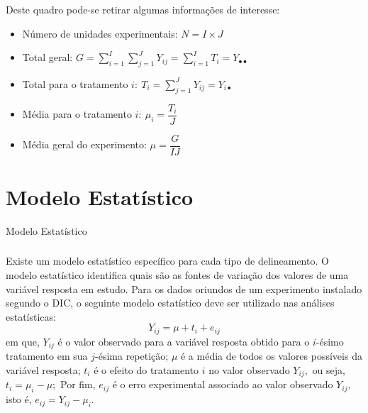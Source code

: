 \documentclass[14pt,aspectratio=1610]{beamer}
\begin{document}
\begin{frame}{}
\frametitle{}
\begin{block}{}
\justifying
Deste quadro pode-se retirar algumas informações de interesse:
\begin{itemize}
\item Número de unidades experimentais: $N=I\times J$\pause
\item Total geral: $G={\displaystyle \sum_{i=1}^{I}\sum_{j=1}^{J}Y_{ij}=\sum_{i=1}^{I}T_{i}=Y_{\bullet \bullet}}$\pause
\item Total para o tratamento $i:\ T_{i}={\displaystyle \sum_{j=1}^{J}Y_{ij}=Y_{i\bullet}}$\pause
\item Média para o tratamento $i:\ \mu_{i}=\dfrac{T_{i}}{J}$\pause
\item Média geral do experimento: $\mu=\dfrac{G}{IJ}$
\end{itemize}
\end{block}
\end{frame}

\section{Modelo Estatístico}
\begin{frame}{Modelo Estatístico}
\frametitle{}
\begin{block}{}
\justifying
Existe um modelo estatístico específico para cada tipo de delineamento. O modelo
estatístico identifica quais são as fontes de variação dos valores de uma variável resposta em estudo. Para os dados oriundos de um experimento instalado segundo o DIC, o seguinte modelo estatístico deve ser utilizado nas análises estatísticas:
$$Y_{ij}=\mu+t_{i}+e_{ij}$$
em que, $Y_{ij}$ é o valor observado para a variável resposta obtido para o $i$-ésimo tratamento em sua $j$-ésima repetição; $\mu$ é a média de todos os valores possíveis da variável resposta; $t_{i}$ é o efeito do tratamento $i$ no valor observado $Y_{ij},$ ou seja, $t_{i}=\mu_{i}-\mu;$ Por fim, $e_{ij}$ é o erro experimental associado ao valor observado $Y_{ij},$ isto é, $e_{ij}=Y_{ij}-\mu_{i}.$
\end{block}
\end{frame}
\end{document}
